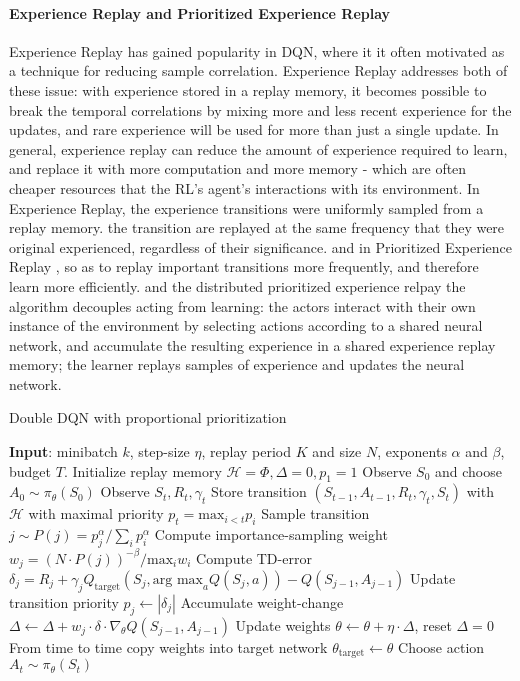 \paragraph{Experience Replay and Prioritized Experience Replay} Experience Replay  \cite{wang2016sample} has gained popularity in DQN, where it it often motivated as a technique for reducing sample correlation. Experience Replay addresses both of these issue: with experience stored in a replay memory, it becomes possible to break the temporal correlations by mixing more and less recent experience for the updates, and rare experience will be used for more than just a single update. In general, experience replay can reduce the amount of experience required to learn, and replace it with more computation and more memory - which are often cheaper resources that the RL's agent's interactions with its environment. In Experience Replay, the experience transitions were uniformly sampled from a replay memory. the transition are replayed at the same frequency that they were original experienced, regardless of their significance.
and in Prioritized Experience Replay \cite{schaul2015prioritized}, so as to replay important transitions more frequently, and therefore learn more efficiently. and the distributed prioritized experience relpay \cite{horgan2018distributed} the algorithm decouples acting from learning: the actors interact with their own instance of the environment by selecting actions according to a shared neural network, and accumulate the resulting experience in a shared experience replay memory; the learner replays samples of experience and updates the neural network. 

\begin{algorithm}
\caption{Double DQN with proportional prioritization}
\begin{algorithmic}
	\State \textbf{Input}: minibatch $k$, step-size $\eta$, replay period $K$ and size $N$, exponents $\alpha$ and $\beta$, budget $T$.
	\State Initialize replay memory $\mathcal{H}=\Phi, \Delta=0, p_{1}=1$
	\State Observe $S_{0}$ and choose $A_{0} \sim \pi_{\theta}(S_{0})$
		\State Observe $S_t, R_t, \gamma_{t}$
		\State Store transition $(S_{t-1}, A_{t-1}, R_{t}, \gamma_t, S_{t})$ with $\mathcal{H}$ with maximal priority $p_{t}=\text{max}_{i<t}p_{i}$
				\State Sample transition $j \sim P(j)=p_{j}^{\alpha}/\sum_{i}p_{i}^{\alpha}$
				\State Compute importance-sampling weight $w_{j}=(N \cdot P(j))^{-\beta}/\text{max}_{i}w_{i}$
				\State Compute TD-error $\delta_{j} = R_{j} + \gamma_{j}Q_{\text{target}}(S_{j}, \text{arg max}_{a}Q(S_j, a)) - Q(S_{j-1}, A_{j-1})$
				\State Update transition priority $p_{j} \leftarrow |\delta_{j}|$
				\State Accumulate weight-change $\Delta \leftarrow \Delta + w_{j} \cdot \delta \cdot \nabla_{\theta}Q(S_{j-1}, A_{j-1})$
			\EndFor
			\State Update weights $\theta \leftarrow \theta + \eta \cdot \Delta$, reset $\Delta = 0$
			\State From time to time copy weights into target network $\theta_{\text{target}} \leftarrow \theta$
		\EndIf
		\State Choose action $A_{t} \sim \pi_{\theta}(S_{t})$
	\EndFor
\end{algorithmic}
\end{algorithm}